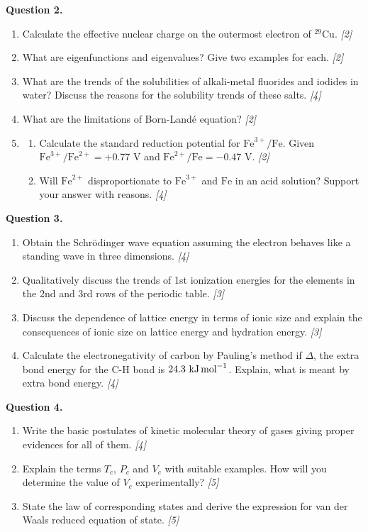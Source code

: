 \documentclass[11pt,a4paper]{article}
\newcommand{\pts}[1]{\hfill \textit{[#1]}}
\begin{document}
\noindent \textbf{Question 2.}
\begin{enumerate}[label=(\alph*)]
  \item Calculate the effective nuclear charge on the outermost electron of $^{29}\text{Cu}$. \pts{2}
  \item What are eigenfunctions and eigenvalues? Give two examples for each. \pts{2}
  \item What are the trends of the solubilities of alkali-metal fluorides and iodides in water? Discuss the reasons for the solubility trends of these salts. \pts{4}
  \item What are the limitations of Born-Landé equation? \pts{2}
  \item 
  \begin{enumerate}[label=(\i*)]
    \item Calculate the standard reduction potential for $\text{Fe}^{3+}/\text{Fe}$. Given $\text{Fe}^{3+}/\text{Fe}^{2+} = +0.77\text{ V}$ and $\text{Fe}^{2+}/\text{Fe} = -0.47\text{ V}$. \pts{2}
    \item Will $\text{Fe}^{2+}$ disproportionate to $\text{Fe}^{3+}$ and $\text{Fe}$ in an acid solution? Support your answer with reasons. \pts{4}
  \end{enumerate}
\end{enumerate}

\bigskip

\noindent \textbf{Question 3.}
\begin{enumerate}[label=(\alph*)]
  \item Obtain the Schrödinger wave equation assuming the electron behaves like a standing wave in three dimensions. \pts{4}
  \item Qualitatively discuss the trends of 1st ionization energies for the elements in the 2nd and 3rd rows of the periodic table. \pts{3}
  \item Discuss the dependence of lattice energy in terms of ionic size and explain the consequences of ionic size on lattice energy and hydration energy. \pts{3}
  \item Calculate the electronegativity of carbon by Pauling's method if $\Delta$, the extra bond energy for the C-H bond is $24.3\text{ kJ\,mol}^{-1}$. Explain, what is meant by extra bond energy. \pts{4}
\end{enumerate}

\bigskip

\noindent \textbf{Question 4.}
\begin{enumerate}[label=(\alph*)]
  \item Write the basic postulates of kinetic molecular theory of gases giving proper evidences for all of them. \pts{4}
  \item Explain the terms $T_c$, $P_c$ and $V_c$ with suitable examples. How will you determine the value of $V_c$ experimentally? \pts{5}
  \item State the law of corresponding states and derive the expression for van der Waals reduced equation of state. \pts{5}
\end{enumerate}
\end{document}
